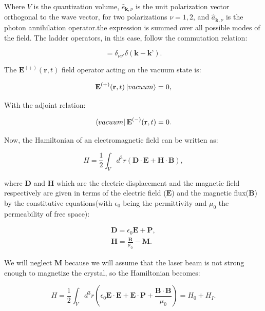 \documentclass[12pt]{book}
\begin{document}
Where $V$ is the quantization volume, $\hat{e}_{\mathbf{k},\nu}$ is the unit polarization vector orthogonal to the wave vector, for two polarizations $\nu=1,2$, and $\hat{a}_{\textbf{k},\nu}$ is the  photon annihilation operator.the expression is summed over all possible modes of the field. The ladder operators, in this case, follow the commutation relation:

\begin{equation}
[\hat{a}_{\textbf{k},\nu},\hat{a^{\dagger}}_{\textbf{k},\nu}]=\delta_{\nu \nu'}\delta(\textbf{k}-\textbf{k'}).
\end{equation} 

The $\textbf{E}^{(+)} (\textbf{r},t)$ field operator acting on the vacuum state is:

\begin{equation}
\textbf{E}^{(+)} (\textbf{r},t)\ket{vacuum}=0,
\end{equation}

With the adjoint relation:

\begin{equation}
\bra{vacuum}\textbf{E}^{(-)} (\textbf{r},t)=0.
\end{equation}

Now, the Hamiltonian of an electromagnetic field can be written as:

\begin{equation}
H=\frac{1}{2}\int_{V} d^{3}r (\mathbf{D \cdot E}+\mathbf{H \cdot B}),
\end{equation}

where $\textbf{D}$ and $\textbf{H}$ which are the electric displacement and the magnetic field respectively are given in terms of the electric field ($\textbf{E}$) and the magnetic flux($\textbf{B}$) by the constitutive equations(with $\epsilon_{0} $ being the permittivity and $\mu_{0}$ the permeability of free space):


\begin{align}
\textbf{D}= \epsilon_{0} \textbf{E}+\textbf{P},\\
\textbf{H}=\frac{\textbf{B}}{\mu_{0}}-\textbf{M}.
\end{align}

We will neglect $\textbf{M}$ because we will assume that the laser beam is not strong enough to magnetize the crystal, so the Hamiltonian becomes:

\begin{equation}
H=\frac{1}{2}\int_{V} d^{3}r \left(\epsilon_{0}\mathbf{E \cdot E}+\mathbf{E \cdot P}+\frac{\mathbf{B \cdot B}}{\mu_{0}} \right)=H_{0}+H_{I}.
\end{equation}
\end{document}
